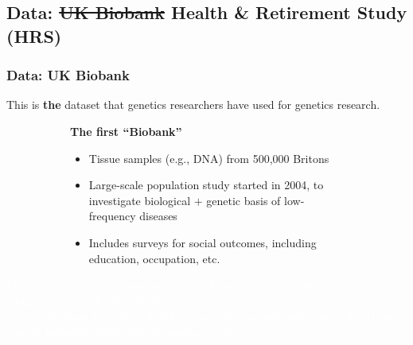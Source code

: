 \documentclass[dvipsnames,handout]{beamer} %
\begin{document}
\subsection{Data: \sout{UK Biobank} Health \& Retirement Study (HRS)}
\begin{frame}
    \frametitle{Data: UK Biobank}
    This is \textbf{the} dataset that genetics researchers have used for genetics research.
    \vspace{-0.5cm}
    \begin{figure}[h!]
        \centering
        \singlespacing
        \begin{subfigure}[c]{0.45\textwidth}
            \centering
        \end{subfigure}
        \hfill
        \begin{subfigure}[c]{0.525\textwidth}
            \textbf{The first ``Biobank''}
            \begin{itemize}
                \item Tissue samples (e.g., DNA) from 500,000 Britons
                \item Large-scale population study started in 2004, to investigate biological $+$ genetic basis of low-frequency diseases
                \item Includes surveys for social outcomes, including education, occupation, etc.
            \end{itemize}
        \end{subfigure}
    \end{figure}
    \vfill
    \textcolor{white}{
    My access has not been processed yet, so I am merely describing the research design for using UK Biobank data. \\
    $\to$ UK Biobank has a $N \approx 30,000$ subsample of people with genetic data from parents included; public data do not have this.}
\end{frame}
\end{document}
